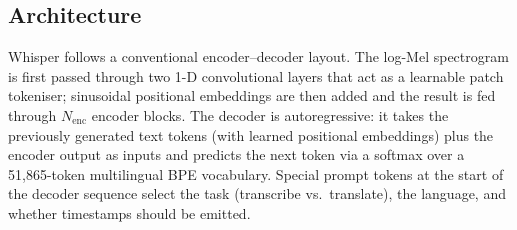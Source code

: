 \subsection{Architecture}

Whisper follows a conventional encoder--decoder layout. The
log-Mel spectrogram is first passed through two 1-D convolutional layers
that act as a learnable patch tokeniser; sinusoidal positional embeddings
are then added and the result is fed through $N_{\mathrm{enc}}$ encoder
blocks. The decoder is autoregressive: it takes the previously generated
text tokens (with learned positional embeddings) plus the encoder output as
inputs and predicts the next token via a softmax over a 51{,}865-token
multilingual BPE vocabulary. Special prompt tokens at the start of the
decoder sequence select the task (transcribe vs.\ translate), the language,
and whether timestamps should be emitted.

